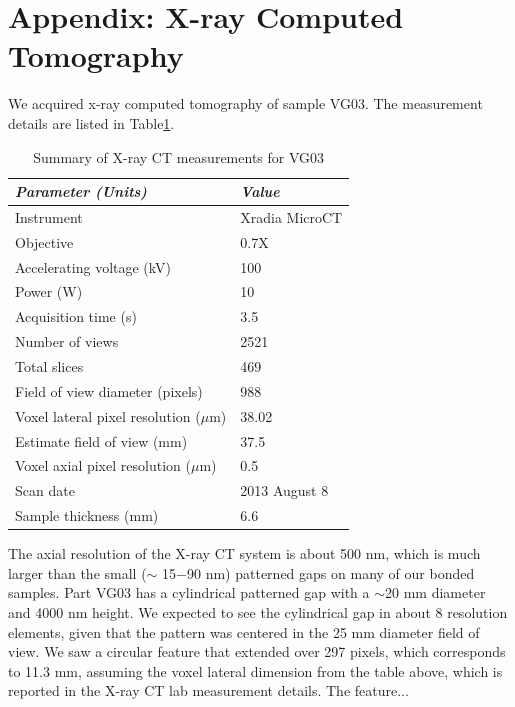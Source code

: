 \documentclass[osajnl,preprint,showpacs,superscriptaddress,12pt]{revtex4-1} %
\begin{document}
\appendix

\section{Appendix: X-ray Computed Tomography}
We acquired x-ray computed tomography of sample VG03.  The measurement details are listed in Table\ref{tab:tablenum4}.

\begin{table}[h!]
\caption{Summary of X-ray CT measurements for VG03 \label{tab:tablenum4}}
\begin{center}
    \begin{tabular}{ll}
    \hline
    \emph{Parameter (Units)} & \emph{Value} \\ 
    \hline
    Instrument& Xradia MicroCT \\
     Objective & 0.7X \\
    Accelerating voltage (kV) & 100 \\
        Power (W) & 10 \\
        Acquisition time (s) & 3.5 \\
        Number of views & 2521 \\
        Total slices & 469 \\
        Field of view diameter (pixels) & 988 \\
        Voxel lateral pixel resolution ($\mu$m) & 38.02 \\
        Estimate field of view (mm) & 37.5 \\
        Voxel axial pixel resolution ($\mu$m) & 0.5 \\
        Scan date & 2013 August 8 \\
        Sample thickness (mm) & 6.6 \\
    \hline
     \end{tabular}
\end{center}
\end{table}

The axial resolution of the X-ray CT system is about 500 nm, which is much larger than the small ($\sim$ 15$-$90 nm) patterned gaps on many of our bonded samples.  Part VG03 has a cylindrical patterned gap with a $\sim$20 mm diameter and 4000 nm height.  We expected to see the cylindrical gap in about 8 resolution elements, given that the pattern was centered in the 25 mm diameter field of view.  We saw a circular feature that extended over 297 pixels, which corresponds to 11.3 mm, assuming the voxel lateral dimension from the table above, which is reported in the X-ray CT lab measurement details.  The feature...
\end{document}
